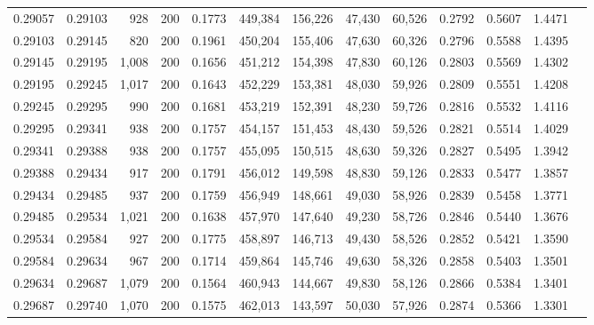 \begin{tabular}{rrrrrrrrrrrrr}
0.29057 & 0.29103 &   928 & 200 &                                     0.1773 & 449,384 & 156,226 &  47,430 &  60,526 & 0.2792 & 0.5607 & 1.4471 \\
0.29103 & 0.29145 &   820 & 200 &                                     0.1961 & 450,204 & 155,406 &  47,630 &  60,326 & 0.2796 & 0.5588 & 1.4395 \\
0.29145 & 0.29195 & 1,008 & 200 &                                     0.1656 & 451,212 & 154,398 &  47,830 &  60,126 & 0.2803 & 0.5569 & 1.4302 \\
0.29195 & 0.29245 & 1,017 & 200 &                                     0.1643 & 452,229 & 153,381 &  48,030 &  59,926 & 0.2809 & 0.5551 & 1.4208 \\
0.29245 & 0.29295 &   990 & 200 &                                     0.1681 & 453,219 & 152,391 &  48,230 &  59,726 & 0.2816 & 0.5532 & 1.4116 \\
0.29295 & 0.29341 &   938 & 200 &                                     0.1757 & 454,157 & 151,453 &  48,430 &  59,526 & 0.2821 & 0.5514 & 1.4029 \\
0.29341 & 0.29388 &   938 & 200 &                                     0.1757 & 455,095 & 150,515 &  48,630 &  59,326 & 0.2827 & 0.5495 & 1.3942 \\
0.29388 & 0.29434 &   917 & 200 &                                     0.1791 & 456,012 & 149,598 &  48,830 &  59,126 & 0.2833 & 0.5477 & 1.3857 \\
0.29434 & 0.29485 &   937 & 200 &                                     0.1759 & 456,949 & 148,661 &  49,030 &  58,926 & 0.2839 & 0.5458 & 1.3771 \\
0.29485 & 0.29534 & 1,021 & 200 &                                     0.1638 & 457,970 & 147,640 &  49,230 &  58,726 & 0.2846 & 0.5440 & 1.3676 \\
0.29534 & 0.29584 &   927 & 200 &                                     0.1775 & 458,897 & 146,713 &  49,430 &  58,526 & 0.2852 & 0.5421 & 1.3590 \\
0.29584 & 0.29634 &   967 & 200 &                                     0.1714 & 459,864 & 145,746 &  49,630 &  58,326 & 0.2858 & 0.5403 & 1.3501 \\
0.29634 & 0.29687 & 1,079 & 200 &                                     0.1564 & 460,943 & 144,667 &  49,830 &  58,126 & 0.2866 & 0.5384 & 1.3401 \\
0.29687 & 0.29740 & 1,070 & 200 &                                     0.1575 & 462,013 & 143,597 &  50,030 &  57,926 & 0.2874 & 0.5366 & 1.3301 \\

\end{tabular}

